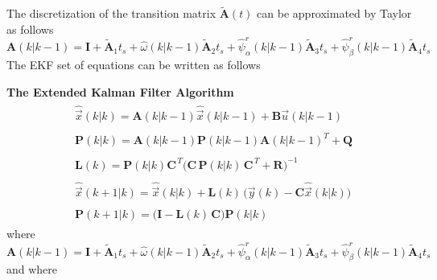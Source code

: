 \documentclass[12pt,a4paper,oneside]{book}
\begin{document}
\begin{onehalfspace}
The discretization of the transition matrix $\tilde{\mathbf{A}}(t)$ can be 
approximated by Taylor as follows
\begin{equation}\label{pmsm_problem_1_eq_12}
	{\mathbf{A}}(k|k-1) = \mathbf{I} + \tilde{\mathbf{A}}_1t_s + 
	\hat{\omega}(k|k-1) \tilde{\mathbf{A}}_2t_s + \hat{\psi}_\alpha^r(k|k-1) 
	\tilde{\mathbf{A}}_3t_s + \hat{\psi}_\beta^r(k|k-1) \tilde{\mathbf{A}}_4t_s
\end{equation}
The EKF set of equations can be written as follows
\begin{mybox}
	\noindent\textbf{The Extended Kalman Filter Algorithm}
	\begin{align}\label{pmsm_problem_1_eq_13}
		\begin{split}
			&\hat{\vec{x}}\left(k|k\right) = \mathbf{A}(k|k-1) 
			\hat{\vec{x}}\left(k|k-1\right) + \mathbf{B} 
			\vec{u}\left(k|k-1\right)
		\end{split} \\[8pt]
		\begin{split}
			&\mathbf{P}\left(k|k\right) = 
			\mathbf{A}(k|k-1)\mathbf{P}\left(k|k-1\right) \mathbf{A}(k|k-1)^T + 
			\mathbf{Q} 
		\end{split}\\[8pt]
		\begin{split}
			&\mathbf{L}(k) = \mathbf{P}(k|k)\mathbf{C}^{\,T} 
			\Big(\mathbf{C}\,\mathbf{P}(k|k)\,\mathbf{C}^{\,T} 
			+\mathbf{R}\Big)^{-1}
		\end{split}\\[8pt]
		\begin{split}
			&\hat{\vec{x}}\left(k+1|k\right) = \hat{\vec{x}}\left(k|k\right) + 
			\mathbf{L}(k)\, \Big(\vec{y}(k) - 
			\mathbf{C}\hat{\vec{x}}\left(k|k\right)\Big)
		\end{split}\\[8pt]
		\begin{split}
			&\mathbf{P}\left(k+1|k\right) = 
			\Big(\mathbf{I}-\mathbf{L}(k)\,\mathbf{C} \Big) 
			\mathbf{P}\left(k|k\right) 
		\end{split}
	\end{align} 
	where
	\begin{equation}\label{pmsm_problem_1_eq_14}
		{\mathbf{A}}(k|k-1) = \mathbf{I} + \tilde{\mathbf{A}}_1t_s + 
		\hat{\omega}(k|k-1) \tilde{\mathbf{A}}_2t_s + \hat{\psi}_\alpha^r(k|k-1) 
		\tilde{\mathbf{A}}_3t_s + \hat{\psi}_\beta^r(k|k-1) \tilde{\mathbf{A}}_4t_s
	\end{equation}
	and where
	\begin{equation}\label{pmsm_problem_1_eq_15}

\end{equation}
\end{mybox}
\end{onehalfspace}
\end{document}
